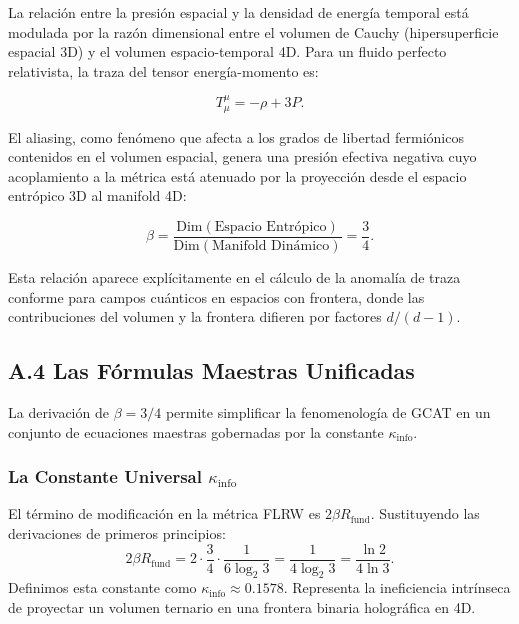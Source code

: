 \documentclass[12pt, a4paper]{article}
\theoremstyle{plain}
\theoremstyle{definition}
\begin{document}
La relación entre la presión espacial y la densidad de energía temporal está 
modulada por la razón dimensional entre el volumen de Cauchy (hipersuperficie 
espacial 3D) y el volumen espacio-temporal 4D. Para un fluido perfecto 
relativista, la traza del tensor energía-momento es:

\begin{equation}
T^\mu_\mu = -\rho + 3P.
\end{equation}

El aliasing, como fenómeno que afecta a los grados de libertad fermiónicos 
contenidos en el volumen espacial, genera una presión efectiva negativa cuyo 
acoplamiento a la métrica está atenuado por la proyección desde el espacio 
entrópico 3D al manifold 4D:

\begin{equation}
\beta = \frac{\text{Dim}(\text{Espacio Entrópico})}{\text{Dim}(\text{Manifold Dinámico})} = \frac{3}{4}.
\end{equation}

Esta relación aparece explícitamente en el cálculo de la anomalía de traza 
conforme para campos cuánticos en espacios con frontera, donde las 
contribuciones del volumen y la frontera difieren por factores $d/(d-1)$.


\subsection{A.4 Las Fórmulas Maestras Unificadas}
\label{app:master_formulas}

La derivación de $\beta = 3/4$ permite simplificar la fenomenología de GCAT en un conjunto de ecuaciones maestras gobernadas por la constante $\kappa_{\text{info}}$.

\subsubsection{La Constante Universal \texorpdfstring{$\kappa_{\text{info}}$}{kappa-info}}
El término de modificación en la métrica FLRW es $2\beta R_{\text{fund}}$. Sustituyendo las derivaciones de primeros principios:
\begin{equation}
2\beta R_{\text{fund}} = 2 \cdot \frac{3}{4} \cdot \frac{1}{6\log_2 3} = \frac{1}{4\log_2 3} = \frac{\ln 2}{4\ln 3}.
\end{equation}
Definimos esta constante como $\kappa_{\text{info}} \approx 0.1578$. Representa la ineficiencia intrínseca de proyectar un volumen ternario en una frontera binaria holográfica en 4D.
\end{document}
